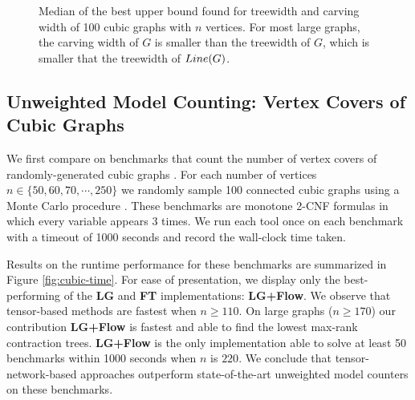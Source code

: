\begin{figure}
	\centering
	
	\caption{\label{fig:vertex-cover-width} Median of the best upper bound found for treewidth and carving width of 100 cubic graphs with $n$ vertices. For most large graphs, the carving width of $G$ is smaller than the treewidth of $G$, which is smaller that the treewidth of $Line(G)$.}
\end{figure}

%	

%	

\subsection{Unweighted Model Counting: Vertex Covers of Cubic Graphs}
\label{sec:tensors:experiments:cubic}

We first compare on benchmarks that count the number of vertex covers of randomly-generated cubic graphs \cite{KCMR18}. For each number of vertices $n \in \{50, 60, 70, \cdots, 250\}$ we randomly sample 100 connected cubic graphs using a Monte Carlo procedure \cite{VL05}. These benchmarks are monotone 2-CNF formulas in which every variable appears 3 times. We run each tool once on each benchmark with a timeout of 1000 seconds and record the wall-clock time taken.

Results on the runtime performance for these benchmarks are summarized in Figure \ref{fig:cubic-time}. For ease of presentation, we display only the best-performing of the \textbf{LG} and \textbf{FT} implementations: \textbf{LG+Flow}. We observe that tensor-based methods are fastest when $n \geq 110$. On large graphs ($n \geq 170$) our contribution \textbf{LG+Flow} is fastest and able to find the lowest max-rank contraction trees. \textbf{LG+Flow} is the only implementation able to solve at least 50 benchmarks within 1000 seconds when $n$ is $220$. We conclude that tensor-network-based approaches outperform state-of-the-art unweighted model counters on these benchmarks.

